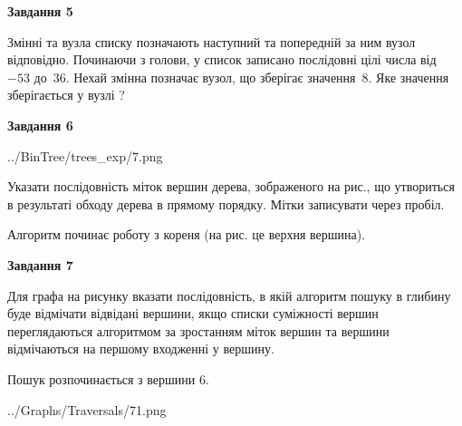 \documentclass[12pt, ukrainian]{article}
\begin{document}
{\begin {large}
{\begin {center}\textbf{Завдання 5}\end {center}}\par
Змінні  та  вузла списку позначають наступний та попередній за ним вузол відповідно. Починаючи з голови, у список записано послідовні цілі числа від~$-53$ до~$36$. Нехай змінна  позначає вузол, що зберігає значення~$8$.
Яке значення зберігається у вузлі  ?\par
\newpage

{\begin {center}\textbf{Завдання 6}\end {center}}\par

\begin{center}
	{../BinTree/trees_exp/7.png}
\end{center}
Указати послідовність міток вершин дерева, зображеного на рис., що утвориться в результаті обходу дерева в прямому порядку. Мітки записувати через пробіл.\par Алгоритм починає роботу з кореня (на рис. це верхня вершина).\par
\newpage

{\begin {center}\textbf{Завдання 7}\end {center}}\par
Для графа на рисунку вказати послідовність, в якій алгоритм пошуку в глибину буде відмічати відвідані вершини, якщо списки суміжності вершин переглядаються алгоритмом за зростанням міток вершин та вершини відмічаються на першому вход\-женні у вершину.\par
Пошук розпочинається з вершини 6.\par

\begin{center}
	{../Graphs/Traversals/71.png}
\end{center}\par
\newpage


\end{large}}
\end{document}
